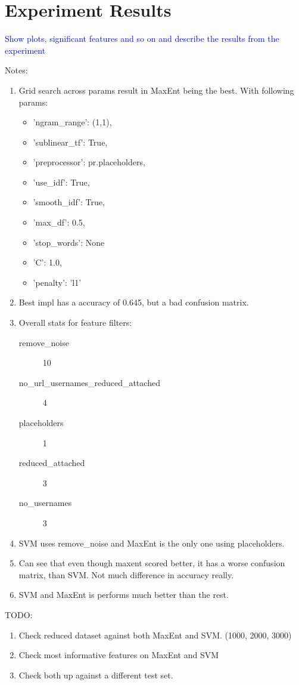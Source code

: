 \section{Experiment Results}
\textcolor{blue}{Show plots, significant features and so on and describe the results from the experiment}

Notes:
\begin{enumerate}
\item Grid search across params result in MaxEnt being the best. With following params:
	\begin{itemize}
		\item 'ngram\_range': (1,1),
		\item  'sublinear\_tf': True,
		\item  'preprocessor': pr.placeholders,
		\item  'use\_idf': True,
		\item  'smooth\_idf': True,
		\item  'max\_df': 0.5,
		\item  'stop\_words': None
	\end{itemize}
	\begin{itemize}
		\item 'C': 1.0,
		\item 'penalty': 'l1'
	\end{itemize}

\item Best impl has a accuracy of 0.645, but a bad confusion matrix.

\item Overall stats for feature filters:
	\begin{description}
		\item[remove\_noise] 10
		\item[no\_url\_usernames\_reduced\_attached] 4
		\item[placeholders] 1
		\item[reduced\_attached] 3
		\item[no\_usernames] 3
	\end{description}

\item SVM uses remove\_noise and MaxEnt is the only one using placeholders. 

\item Can see that even though maxent scored better, it has a worse confusion matrix, than SVM. Not much difference in accuracy really. 

\item SVM and MaxEnt is performs much better than the rest. 
\end{enumerate}


TODO:
\begin{enumerate}
\item Check reduced dataset against both MaxEnt and SVM. (1000, 2000, 3000)
\item Check most informative features on MaxEnt and SVM
\item Check both up against a different test set. 
\end{enumerate}